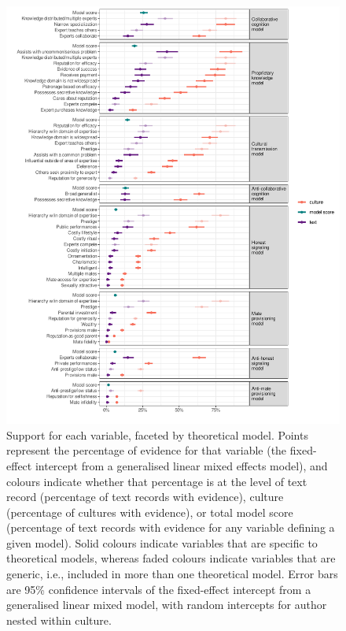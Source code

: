 \documentclass[
  11pt,
]{article}
\begin{document}
\begin{figure}

{\centering \includegraphics{conceptual-experts-paper_files/figure-latex/maintextplot-1} 

}

\caption{Support for each variable, faceted by theoretical model. Points represent the percentage of evidence for that variable (the fixed-effect intercept from a generalised linear mixed effects model), and colours indicate whether that percentage is at the level of text record (percentage of text records with evidence), culture (percentage of cultures with evidence), or total model score (percentage of text records with evidence for any variable defining a given model). Solid colours indicate variables that are specific to theoretical models, whereas faded colours indicate variables that are generic, i.e., included in more than one theoretical model. Error bars are 95\% confidence intervals of the fixed-effect intercept from a generalised linear mixed model, with random intercepts for author nested within culture.}\label{fig:maintextplot}
\end{figure}
\end{document}
